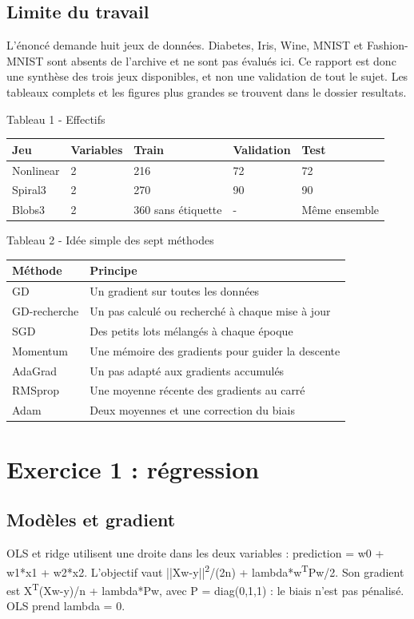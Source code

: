 \documentclass[10pt,a4paper]{article}
\begin{document}
\subsection*{Limite du travail}
L’énoncé demande huit jeux de données. Diabetes, Iris, Wine, MNIST et Fashion-MNIST sont absents de l’archive et ne sont pas évalués ici. Ce rapport est donc une synthèse des trois jeux disponibles, et non une validation de tout le sujet. Les tableaux complets et les figures plus grandes se trouvent dans le dossier resultats.

\begin{center}{\footnotesize Tableau 1 - Effectifs\par\medskip\begin{tabular}{lllll}\toprule
Jeu & Variables & Train & Validation & Test \\
\midrule
Nonlinear & 2 & 216 & 72 & 72 \\
Spiral3 & 2 & 270 & 90 & 90 \\
Blobs3 & 2 & 360 sans étiquette & - & Même ensemble \\
\bottomrule\end{tabular}}\end{center}
\begin{center}{\footnotesize Tableau 2 - Idée simple des sept méthodes\par\medskip\begin{tabular}{ll}\toprule
Méthode & Principe \\
\midrule
GD & Un gradient sur toutes les données \\
GD-recherche & Un pas calculé ou recherché à chaque mise à jour \\
SGD & Des petits lots mélangés à chaque époque \\
Momentum & Une mémoire des gradients pour guider la descente \\
AdaGrad & Un pas adapté aux gradients accumulés \\
RMSprop & Une moyenne récente des gradients au carré \\
Adam & Deux moyennes et une correction du biais \\
\bottomrule\end{tabular}}\end{center}
\newpage
\section*{Exercice 1 : régression}
\subsection*{Modèles et gradient}
OLS et ridge utilisent une droite dans les deux variables : prediction = w0 + w1*x1 + w2*x2. L’objectif vaut ||Xw-y||\textsuperscript{2}/(2n) + lambda*w\textsuperscript{T}Pw/2. Son gradient est X\textsuperscript{T}(Xw-y)/n + lambda*Pw, avec P = diag(0,1,1) : le biais n’est pas pénalisé. OLS prend lambda = 0.
\end{document}
